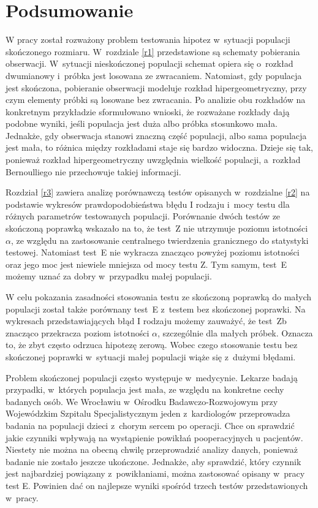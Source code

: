 \chapter*{Podsumowanie}

W pracy został rozważony problem testowania hipotez w~sytuacji populacji skończonego rozmiaru. W~rozdziale \ref{r1} przedstawione są schematy pobierania obserwacji. W~sytuacji nieskończonej populacji schemat opiera się o~rozkład dwumianowy i~próbka jest losowana ze zwracaniem. Natomiast, gdy populacja jest skończona, pobieranie obserwacji modeluje rozkład hipergeometryczny, przy czym elementy próbki są losowane bez zwracania. Po analizie obu rozkładów na konkretnym przykładzie sformułowano wnioski, że rozważane rozkłady dają podobne wyniki, jeśli populacja jest duża albo próbka stosunkowo mała. Jednakże, gdy obserwacja stanowi znaczną część populacji, albo sama populacja jest mała, to różnica między rozkładami staje się bardzo widoczna. Dzieje się tak, ponieważ rozkład hipergeometryczny uwzględnia wielkość populacji, a~rozkład Bernoulliego nie przechowuje takiej informacji.

Rozdział \ref{r3} zawiera analizę porównawczą testów opisanych w~rozdzialne \ref{r2} na podstawie wykresów prawdopodobieństwa błędu I rodzaju i~mocy testu dla różnych parametrów testowanych populacji. Porównanie dwóch testów ze skończoną poprawką wskazało na to, że test~Z nie utrzymuje poziomu istotności $\alpha$, ze względu na zastosowanie centralnego twierdzenia granicznego do statystyki testowej. Natomiast test~E nie wykracza znacząco powyżej poziomu istotności oraz jego moc jest niewiele mniejsza od mocy testu Z. Tym samym, test~E możemy uznać za dobry w~przypadku małej populacji.

W celu pokazania zasadności stosowania testu ze skończoną poprawką do małych populacji został także porównany test~E z~testem bez skończonej poprawki. Na wykresach przedstawiających błąd I rodzaju możemy zauważyć, że test~Zb znacząco przekracza poziom istotności $\alpha$, szczególnie dla małych próbek. Oznacza to, że zbyt często odrzuca hipotezę zerową. Wobec czego stosowanie testu bez skończonej poprawki w~sytuacji małej populacji wiąże się z~dużymi błędami.

Problem skończonej populacji często występuje w~medycynie. Lekarze badają przypadki, w~których populacja jest mała, ze względu na konkretne cechy badanych osób. We Wrocławiu w~Ośrodku Badawczo-Rozwojowym przy Wojewódzkim Szpitalu Specjalistycznym jeden z~kardiologów przeprowadza badania na populacji dzieci z~chorym sercem po operacji. Chce on sprawdzić jakie czynniki wpływają na wystąpienie powikłań pooperacyjnych u pacjentów. Niestety nie można na obecną chwilę przeprowadzić analizy danych, ponieważ badanie nie zostało jeszcze ukończone. Jednakże, aby sprawdzić, który czynnik jest najbardziej powiązany z~powikłaniami, można zastosować opisany w~pracy test E. Powinien dać on najlepsze wyniki spośród trzech testów przedstawionych w~pracy.